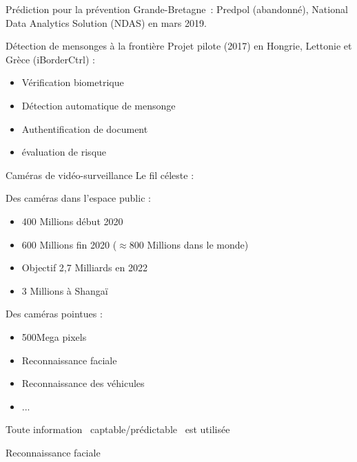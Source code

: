 \begin{frame}{Prédiction pour la prévention}
  Grande-Bretagne~: Predpol (abandonné), National Data Analytics Solution (NDAS) en mars 2019.

\end{frame}

\begin{frame}{Détection de mensonges à la frontière}
  Projet pilote (2017) en Hongrie, Lettonie et Grèce (iBorderCtrl) :
  \begin{itemize}
    \item Vérification biometrique
    \item Détection automatique de mensonge
    \item Authentification de document 
    \item évaluation de risque
  \end{itemize}
\end{frame}

\begin{frame}{Caméras de vidéo-surveillance}
  Le fil céleste :
  \begin{minipage}[c]{0.49\linewidth}
    Des caméras dans l'espace public :
    \begin{itemize}
      \item 400 Millions début 2020 
      \item 600 Millions fin 2020 ($\approx$800 Millions dans le monde)
      \item Objectif 2,7 Milliards en 2022
      \item 3 Millions à Shangaï
      \end{itemize}
    \end{minipage}\hfill
  \begin{minipage}[c]{0.49\linewidth}
    Des caméras pointues :
    \begin{itemize}
      \item 500Mega pixels
      \item Reconnaissance faciale
      \item Reconnaissance des véhicules
      \item ...
    \end{itemize}
  \end{minipage}\hfill
  Toute information ~captable/prédictable~ est utilisée
\end{frame}

\begin{frame}{Reconnaissance faciale}
\end{frame}

